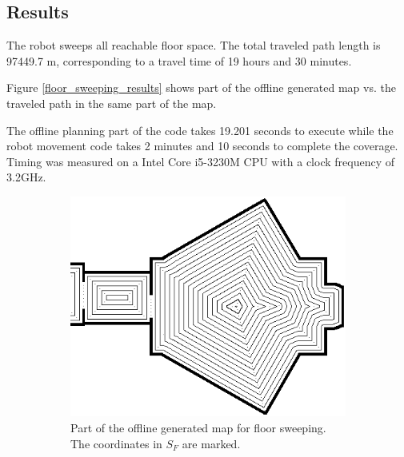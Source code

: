 \subsection{Results}
The robot sweeps all reachable floor space.
The total traveled path length is 97449.7 m, corresponding to a travel time of 19 hours and 30 minutes.

Figure \ref{floor_sweeping_results} shows part of the offline generated map vs. the traveled path in the same part of the map.

The offline planning part of the code takes 
19.201 seconds to execute
while the robot movement code takes
2 minutes and 10 seconds 
to complete the coverage.
Timing was measured on a Intel Core i5-3230M CPU with a clock frequency of 3.2GHz.

\begin{figure}[ht]
\centering
  \begin{subfigure}[t]{0.3\textwidth}
    \includegraphics[width = \textwidth]{graphics/floor_sweep_plan}
    \caption{Part of the offline generated map for floor sweeping. The coordinates in \(S_{F}\) are marked.}
    \label{floor_sweep_plan}
  \end{subfigure}
  \begin{subfigure}[t]{0.3\textwidth}

\end{subfigure}
\end{figure}
